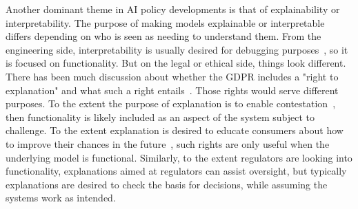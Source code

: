 \documentclass[acmconf,manuscript,screen,natbib=true]{acmart}
\begin{document}
Another dominant theme in AI policy developments is that of explainability or interpretability. %
The purpose of making models explainable or interpretable differs depending on who is seen as needing to understand them. From the engineering side, interpretability is
usually desired 
for debugging purposes~\cite{bhatt2020explainable}, so it is focused on functionality. But on the legal or ethical side, things look different. There has been much discussion about whether the GDPR includes a "right to explanation" and what such a right entails~\cite{kaminski2019right, selbst2017meaningful, wachter2017right, edwards2017slave}. Those rights would serve different purposes. To the extent the purpose of explanation is to enable contestation~\cite{kaminski2021right}, then functionality is likely included as an aspect of the system subject to challenge. To the extent explanation is desired to educate consumers about how to improve their chances in the future~\cite{barocas2020hidden}, such rights are only useful when the underlying model is functional.
Similarly, to the extent regulators are looking into functionality, %
explanations aimed at regulators can assist oversight, but typically explanations are desired to %
check the basis for decisions, while assuming the systems work as intended.
\end{document}
